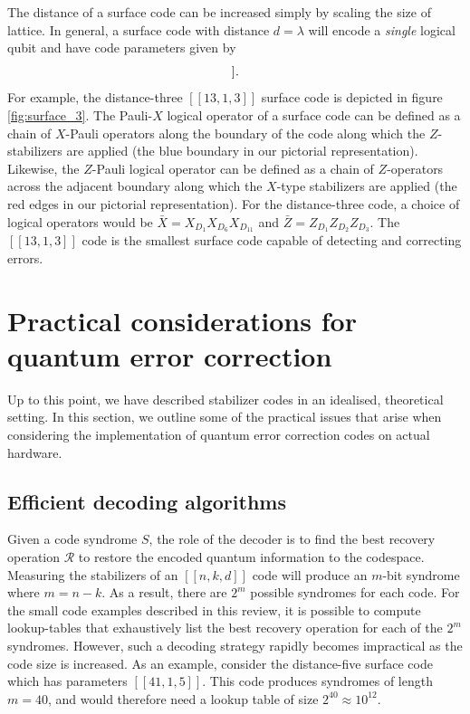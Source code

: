 \documentclass[]{arxiv}
\theoremstyle{plain}%
\theoremstyle{definition}
\theoremstyle{remark}
\begin{document}
The distance of a surface code can be increased simply by scaling the size of lattice. In general, a surface code with distance $d=\lambda$ will encode a \textit{single} logical qubit and have code parameters given by 
%
\begin{equation}
[[n=\lambda^2+(\lambda -1)^2,k=1,d=\lambda]]\rm .
\end{equation}
%
For example, the distance-three $[[13,1,3]]$ surface code is depicted in figure \ref{fig:surface_3}. The Pauli-$X$ logical operator of a surface code can be defined as a chain of $X$-Pauli operators along the boundary of the code along which the $Z$-stabilizers are applied (the blue boundary in our pictorial representation). Likewise, the $Z$-Pauli logical operator can be defined as a chain of $Z$-operators across the adjacent boundary along which the $X$-type stabilizers are applied (the red edges in our pictorial representation). For the distance-three code, a choice of logical operators would be $\bar{X}=X_{D_1}X_{D_6}X_{D_{11}}$ and $\bar{Z}=Z_{D_1}Z_{D_2}Z_{D_3}$. The $[[13,1,3]]$ code is the smallest surface code capable of detecting and correcting errors. 
  

\section{Practical considerations for quantum error correction}\label{sec:practical}

Up to this point, we have described stabilizer codes in an idealised, theoretical setting. In this section, we outline some of the practical issues that arise when considering the implementation of quantum error correction codes on actual hardware.

\subsection{Efficient decoding algorithms}\label{sec:decode}

Given a code syndrome $S$, the role of the decoder is to find the best recovery operation $\mathcal{R}$ to restore the encoded quantum information to the codespace. Measuring the stabilizers of an $[[n,k,d]]$ code will produce an $m$-bit syndrome where $m=n-k$. As a result, there are $2^m$ possible syndromes for each code. For the small code examples described in this review, it is possible to compute lookup-tables  that exhaustively list the best recovery operation for each of the $2^m$ syndromes. However, such a decoding strategy rapidly becomes impractical as the code size is increased. As an example, consider the distance-five surface code which has parameters $[[41,1,5]]$. This code produces syndromes of length $m=40$, and would therefore need a lookup table of size $2^{40}\approx 10^{12}$.
\end{document}
